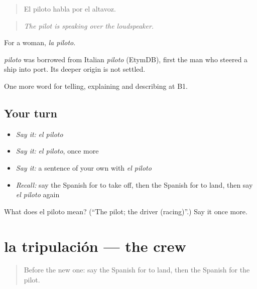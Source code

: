 \begin{quote}
El piloto habla por el altavoz.
\end{quote}

\begin{quote}
\emph{The pilot is speaking over the loudspeaker.}
\end{quote}

For a woman, \emph{la piloto}.

\begin{cousinweb}
\emph{piloto} was borrowed from Italian \emph{piloto} (EtymDB), first the man who steered a ship into port. Its deeper origin is not settled.
\end{cousinweb}

\begin{grammarlens}[title={What you've built}]
One more word for telling, explaining and describing at B1.
\end{grammarlens}

\subsection*{Your turn}
\begin{itemize}
\raggedright
  \item \emph{Say it:} \emph{el piloto}
  \item \emph{Say it:} \emph{el piloto}, once more
  \item \emph{Say it:} a sentence of your own with \emph{el piloto}
  \item \emph{Recall:} say the Spanish for to take off, then the Spanish for to land, then say \emph{el piloto} again
\end{itemize}

\begin{tcolorbox}[breakable,colback=teal!4,colframe=teal!35!black,title={Before you move on}]
What does el piloto mean? (\textquotedblleft{}The pilot; the driver (racing)\textquotedblright{}.) Say it once more.
\end{tcolorbox}
\section[la tripulación]{la tripulación — the crew}

\label{lesson:ES-C654-tripulacion}



\begin{quote}
Before the new one: say the Spanish for to land, then the Spanish for the pilot.
\end{quote}

